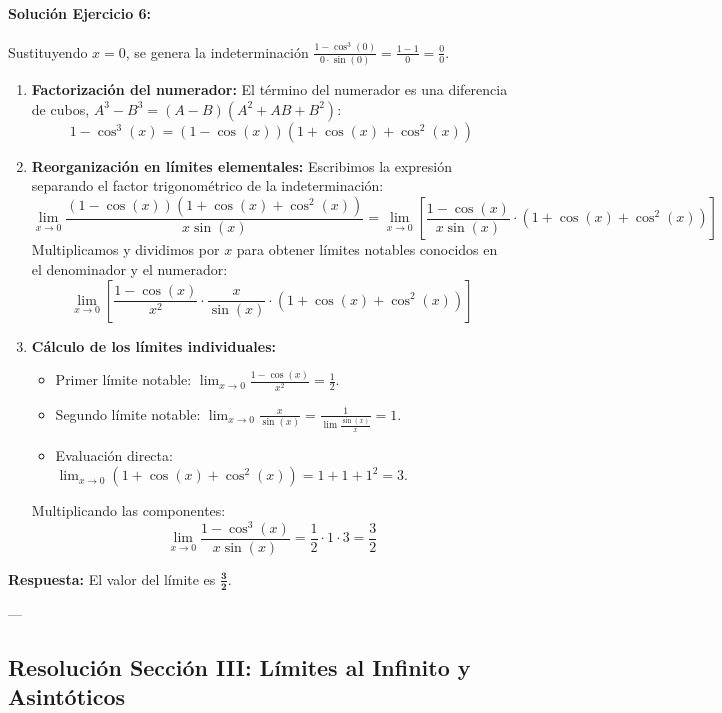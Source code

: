 \documentclass[11pt,letterpaper]{article}
\begin{document}
\paragraph{Solución Ejercicio 6:}
Sustituyendo $x=0$, se genera la indeterminación $\frac{1-\cos^3(0)}{0 \cdot \sin(0)} = \frac{1-1}{0} = \frac{0}{0}$.
\begin{enumerate}
    \item \textbf{Factorización del numerador:} El término del numerador es una diferencia de cubos, $A^3 - B^3 = (A-B)(A^2+AB+B^2)$:
    $$1 - \cos^3(x) = (1 - \cos(x))(1 + \cos(x) + \cos^2(x))$$
    \item \textbf{Reorganización en límites elementales:} Escribimos la expresión separando el factor trigonométrico de la indeterminación:
    $$\lim_{x\to 0} \frac{(1 - \cos(x))(1 + \cos(x) + \cos^2(x))}{x\sin(x)} = \lim_{x\to 0} \left[ \frac{1 - \cos(x)}{x\sin(x)} \cdot (1 + \cos(x) + \cos^2(x)) \right]$$
    Multiplicamos y dividimos por $x$ para obtener límites notables conocidos en el denominador y el numerador:
    $$\lim_{x\to 0} \left[ \frac{1 - \cos(x)}{x^2} \cdot \frac{x}{\sin(x)} \cdot (1 + \cos(x) + \cos^2(x)) \right]$$
    \item \textbf{Cálculo de los límites individuales:}
    \begin{itemize}
        \item Primer límite notable: $\lim_{x\to 0} \frac{1-\cos(x)}{x^2} = \frac{1}{2}$.
        \item Segundo límite notable: $\lim_{x\to 0} \frac{x}{\sin(x)} = \frac{1}{\lim \frac{\sin(x)}{x}} = 1$.
        \item Evaluación directa: $\lim_{x\to 0} (1 + \cos(x) + \cos^2(x)) = 1 + 1 + 1^2 = 3$.
    \end{itemize}
    Multiplicando las componentes:
    $$\lim_{x\to 0} \frac{1 - \cos^3(x)}{x\sin(x)} = \frac{1}{2} \cdot 1 \cdot 3 = \frac{3}{2}$$
\end{enumerate}
\textbf{Respuesta:} El valor del límite es $\mathbf{\frac{3}{2}}$.

---

\subsection{Resolución Sección III: Límites al Infinito y Asintóticos}
\end{document}

